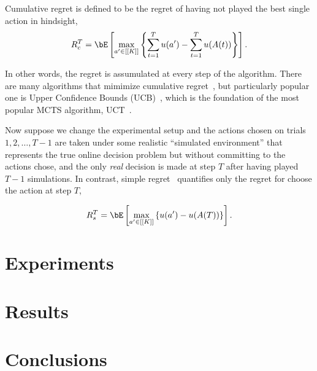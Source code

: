 \documentclass{kecsmstr}
\begin{document}
\begin{chaptercontents}
Cumulative regret is defined to be the regret of having not played the best single action in hindsight, 
\begin{equation}
R_c^T = \bE \left[ \max_{a' \in [[K]]} \left\{ \sum_{t=1}^T u(a') - \sum_{t=1}^T u(A(t)) \right\} \right].
\end{equation}

In other words, the regret is assumulated at every step of the algorithm. There are many algorithms that 
mimimize cumulative regret~\cite{}, but particularly popular one is Upper Confidence Bounds (UCB)~\cite{UCB}, which is the foundation of the most popular MCTS algorithm, UCT~\cite{UCT}.

Now suppose we change the experimental setup and the actions chosen on trials $1, 2, \ldots, T-1$ are taken under some realistic ``simulated environment'' that represents the true online decision problem but without committing to the actions chose, and the only {\it real} decision is made at step $T$ after having played $T-1$ simulations. In contrast, simple regret~\cite{Bubeck11Pure} quantifies only the regret for choose the action at step $T$,

\begin{equation}
R_s^T = \bE \left[  \max_{a' \in [[K]]} \left\{ u(a') - u(A(T)) \right\} \right].
\end{equation}

\end{chaptercontents}

\chapter{Experiments}

\chapter{Results}

\chapter{Conclusions}

 \emptypage

\appendix




 \emptypage

\end{document}
